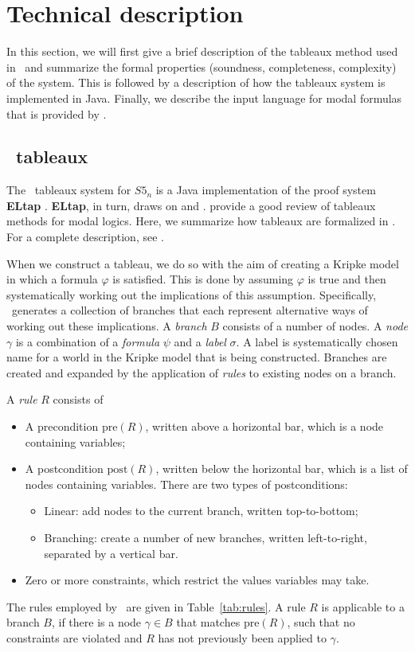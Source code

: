 \section{Technical description}

In this section, we will first give a brief description of the tableaux method
used in \oops\ and summarize the formal properties (soundness, completeness,
complexity) of the system. This is followed by a description of how the
tableaux system is implemented in Java. Finally, we describe the input language
for modal formulas that is provided by \oops.

\subsection{\oops\ tableaux}

The \oops\ tableaux system for $S5_n$ is a Java \citep{gosling2005}
implementation of the proof system {\bf ELtap} \citep{deboer2006}.  {\bf
ELtap}, in turn, draws on \citet{fitting1999} and \citet{beckert1997}.
\citet{halpern1992} provide a good review of tableaux methods for modal logics.
Here, we summarize how tableaux are formalized in \oops. For a complete
description, see \citet{valkenhoef2008}.

When we construct a tableau, we do so with the aim of creating a Kripke model
in which a formula $\varphi$ is satisfied. This is done by assuming $\varphi$
is true and then systematically working out the implications of this
assumption. Specifically, \oops\ generates a collection of branches that each
represent alternative ways of working out these implications. A {\em branch}
$B$ consists of a number of nodes. A {\em node} $\gamma$ is a combination of a
{\em formula} $\psi$ and a {\em label} $\sigma$. A label is systematically
chosen name for a world in the Kripke model that is being constructed. Branches
are created and expanded by the application of {\em rules} to existing nodes on
a branch. 



A {\em rule} $R$ consists of
\begin{itemize}
\item A precondition $\mathrm{pre}(R)$, written above a horizontal bar, which
is a node containing variables;
\item A postcondition $\mathrm{post}(R)$, written below the horizontal bar,
which is a list of nodes containing variables. There are two types of
postconditions:
\begin{itemize}
\item Linear: add nodes to the current branch, written top-to-bottom;
\item Branching: create a number of new branches, written left-to-right, separated by a vertical bar.
\end{itemize}
\item Zero or more constraints, which restrict the values variables may take.
\end{itemize}
The rules employed by \oops\ are given in Table~\ref{tab:rules}. A rule $R$ is
applicable to a branch $B$, if there is a node $\gamma \in B$ that matches
$\mathrm{pre}(R)$, such that no constraints are violated and $R$ has not
previously been applied to $\gamma$.

